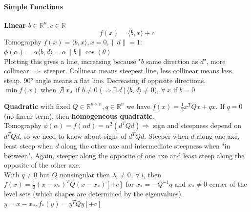 \documentclass[10pt]{report}
\begin{document}
\paragraph{Simple Functions} \begin{list}{}{}
	\item \textbf{Linear} $b \in \mathbb{R}^n, c\in \mathbb{R}$ $$f(x) = \langle b,x\rangle + c$$
	Tomography $f(x) = \langle b,x\rangle, x = 0, \|d\|=1$: $\phi(\alpha) = \alpha\langle b, d\rangle = \alpha\|b\|\cos(\theta)$\\
	Plotting this gives a line, increasing because "$b$ same direction as $d$", more collinear $\Rightarrow$ steeper. Collinear means steepest line, less collinear means less steap. 90° angle means a flat line. Decreasing if opposite directions.\\
	$\min f(x)$ when $\not\exists\:x_*$ if $b \neq 0$ ($\Rightarrow \exists\: d\:|\:\langle b,d\rangle \neq 0$), $\forall\:x$ if $b = 0$
	\item \textbf{Quadratic} with fixed $Q\in \mathbb{R}^{n\times n}, q\in \mathbb{R}^n$ we have $f(x) = \frac{1}{2}x^TQx + qx$. If $q=0$ (no linear term), then \textbf{homogeneous quadratic}.\\
	Tomography $\phi(\alpha) = f(\alpha d) = \alpha^2(d^TQd)\Rightarrow$ sign and steepness depend on $d^TQd$, so we need to know about signs of $d^TQd$. Steeper when $d$ along one axe, least steep when $d$ along the other axe and intermediate steepness when "in between". Again, steeper along the opposite of one axe and least steep along the opposite of the other axe.\\
	With $q\neq 0$ but $Q$ nonsingular then $\lambda_i\neq 0\:\:\:\forall\:i$, then $f(x)=\frac{1}{2}(x-x_*)^TQ(x-x_*) [+c]$ for $x_* = -Q^{-1}q$ and $x_* \neq 0$ center of the level sets (which shapes are determined by the eigenvalues).\\
	$y = x - x_*, f_*(y) = y^TQy [+c]$
\end{list}
\end{document}
